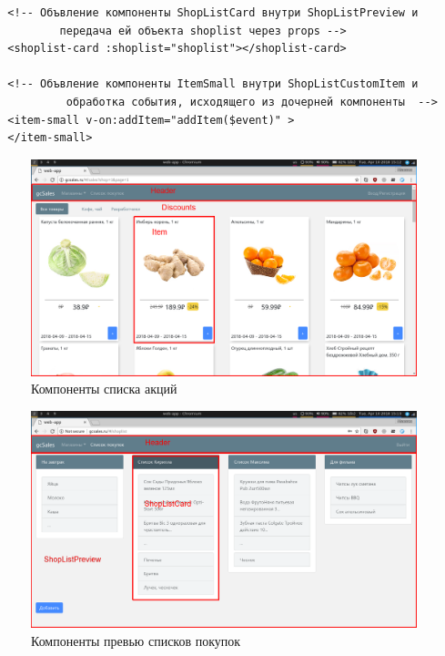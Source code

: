\begin{verbatim}
  <!-- Объвление компоненты ShopListCard внутри ShopListPreview и
          передача ей объекта shoplist через props -->
  <shoplist-card :shoplist="shoplist"></shoplist-card>

  <!-- Объвление компоненты ItemSmall внутри ShopListCustomItem и
           обработка события, исходящего из дочерней компоненты  -->
  <item-small v-on:addItem="addItem($event)" >
  </item-small>
\end{verbatim}

\begin{figure}[H]
    \centering
    \includegraphics[width=\textwidth]{./screenshots/discounts_border.png}
    \caption{\small{Компоненты списка акций}}
    \label{database}
\end{figure}

\begin{figure}[H]
    \centering
    \includegraphics[width=\textwidth]{./screenshots/shoplist_preview_border.png}
    \caption{\small{Компоненты превью списков покупок}}
    \label{database}
\end{figure}

